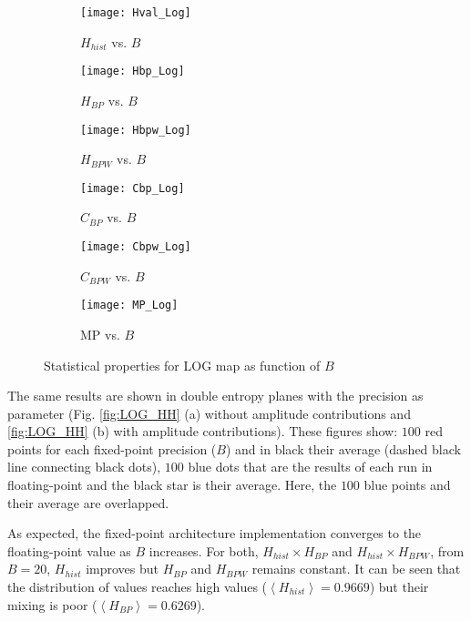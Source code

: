\begin{figure}[htpb]
	\centering
	\begin{subfigure}[b]{0.49\textwidth}
		\texttt{[image: Hval\_Log]}
		\caption{$H_{hist}$ vs. $B$}
		\label{fig:Hval_Log}
	\end{subfigure}
	\begin{subfigure}[b]{0.49\textwidth}
		\texttt{[image: Hbp\_Log]}
		\caption{$H_{BP}$ vs. $B$}
		\label{fig:Hbp_Log}
	\end{subfigure}
	\begin{subfigure}[b]{0.49\textwidth}
		\texttt{[image: Hbpw\_Log]}
		\caption{$H_{BPW}$ vs. $B$}
		\label{fig:Hbpw_Log}
	\end{subfigure}
	\begin{subfigure}[b]{0.49\textwidth}
		\texttt{[image: Cbp\_Log]}
		\caption{$C_{BP}$ vs. $B$}
		\label{fig:Cbp_Log}
	\end{subfigure}
	\begin{subfigure}[b]{0.49\textwidth}
		\texttt{[image: Cbpw\_Log]}
		\caption{$C_{BPW}$ vs. $B$}
		\label{fig:Cbpw_Log}
	\end{subfigure}
	\begin{subfigure}[b]{0.49\textwidth}
		\texttt{[image: MP\_Log]}
		\caption{MP vs. $B$}
		\label{fig:MP_Log}
	\end{subfigure}
	\caption{Statistical properties for LOG map as function of $B$}
	\label{fig:LOG_QuantiB}
\end{figure}

The same results are shown in double entropy planes with the precision as parameter (Fig. \ref{fig:LOG_HH} (a) without amplitude contributions and \ref{fig:LOG_HH} (b) with amplitude contributions).
These figures show: $100$ red points for each fixed-point precision ($B$) and in black their average (dashed black line connecting black dots), $100$ blue dots that are the results of each run in floating-point and the black star is their average.
Here, the $100$ blue points and their average are overlapped.

As expected, the fixed-point architecture implementation converges to the floating-point value as $B$ increases.
For both, $H_{hist} \times H_{BP}$ and $H_{hist} \times H_{BPW}$, from $B=20$, $H_{hist}$ improves but $H_{BP}$ and $H_{BPW}$ remains constant.
It can be seen that the distribution of values reaches high values ($\left\langle H_{hist}\right\rangle =0.9669$) but their mixing is poor ($\left\langle H_{BP}\right\rangle =0.6269$).

